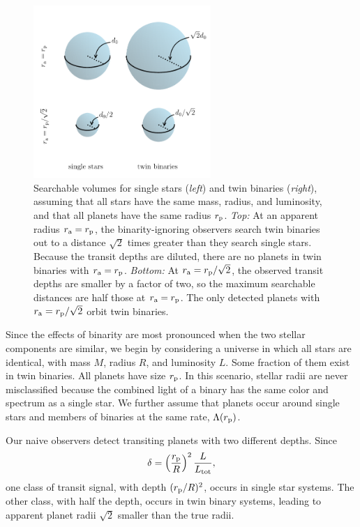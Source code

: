 \documentclass[12pt,modern]{aastex61}
\renewcommand{\a}{_{\rm a}}
\newcommand{\p}{_{\rm p}}
\begin{document}
\begin{figure}[!tb]
    \begin{center}
        \includegraphics[width=0.6\textwidth]{figures/visualize_volumes.pdf}
    \end{center}
    \caption{
        Searchable volumes for single stars ({\it left}) and twin
        binaries ({\it right}), assuming that all stars have the same
        mass, radius, and luminosity, and that all planets have the
        same radius $r\p$.
        {\it Top:} At an apparent radius $r\a=r\p$, the
        binarity-ignoring observers search twin binaries out to a
        distance $\sqrt{2}$ times greater than they search single
        stars.  Because the transit depths are diluted, there are no 
        planets in twin binaries with $r\a=r\p$.
        {\it Bottom:} At $r\a=r\p/\sqrt{2}$, the observed transit
        depths are smaller by a factor of two, so the maximum
        searchable distances are half those at $r\a=r\p$.  The only
        detected planets with $r\a=r\p/\sqrt{2}$ orbit twin binaries.
    }
    \label{fig:model_1_volumes}
\end{figure}

Since the effects of binarity are most pronounced when the two stellar
components are similar, we begin by considering a universe in which
all stars are identical, with mass $M$, radius $R$, and luminosity
$L$.  Some fraction of them exist in twin binaries. All planets have
size $r\p$.  In this scenario, stellar radii are never misclassified
because the combined light of a binary has the same color and spectrum
as a single star.  We further assume that planets occur around single
stars and members of binaries at the same rate, $\Lambda(r\p)$.

Our naive observers detect transiting planets with two different
depths. Since 
\begin{equation}
    \delta = \left(\frac{r\p}{R}\right)^2 \frac{L}{L_{\rm tot}},
    \label{eq:delta_obs_general} 
\end{equation}
one class of transit signal, with depth $(r\p/R)^2$, occurs in single
star systems. The other class, with half the depth, occurs in twin
binary systems, leading to apparent planet radii $\sqrt{2}$ smaller
than the true radii.
\end{document}
